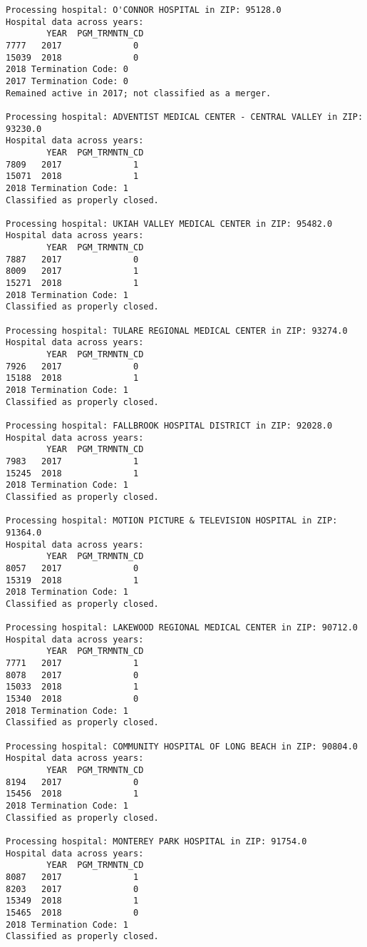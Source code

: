 \documentclass[
  letterpaper,
  DIV=11,
  numbers=noendperiod]{scrartcl}
\begin{document}
\begin{verbatim}
Processing hospital: O'CONNOR HOSPITAL in ZIP: 95128.0
Hospital data across years:
        YEAR  PGM_TRMNTN_CD
7777   2017              0
15039  2018              0
2018 Termination Code: 0
2017 Termination Code: 0
Remained active in 2017; not classified as a merger.

Processing hospital: ADVENTIST MEDICAL CENTER - CENTRAL VALLEY in ZIP: 93230.0
Hospital data across years:
        YEAR  PGM_TRMNTN_CD
7809   2017              1
15071  2018              1
2018 Termination Code: 1
Classified as properly closed.

Processing hospital: UKIAH VALLEY MEDICAL CENTER in ZIP: 95482.0
Hospital data across years:
        YEAR  PGM_TRMNTN_CD
7887   2017              0
8009   2017              1
15271  2018              1
2018 Termination Code: 1
Classified as properly closed.

Processing hospital: TULARE REGIONAL MEDICAL CENTER in ZIP: 93274.0
Hospital data across years:
        YEAR  PGM_TRMNTN_CD
7926   2017              0
15188  2018              1
2018 Termination Code: 1
Classified as properly closed.

Processing hospital: FALLBROOK HOSPITAL DISTRICT in ZIP: 92028.0
Hospital data across years:
        YEAR  PGM_TRMNTN_CD
7983   2017              1
15245  2018              1
2018 Termination Code: 1
Classified as properly closed.

Processing hospital: MOTION PICTURE & TELEVISION HOSPITAL in ZIP: 91364.0
Hospital data across years:
        YEAR  PGM_TRMNTN_CD
8057   2017              0
15319  2018              1
2018 Termination Code: 1
Classified as properly closed.

Processing hospital: LAKEWOOD REGIONAL MEDICAL CENTER in ZIP: 90712.0
Hospital data across years:
        YEAR  PGM_TRMNTN_CD
7771   2017              1
8078   2017              0
15033  2018              1
15340  2018              0
2018 Termination Code: 1
Classified as properly closed.

Processing hospital: COMMUNITY HOSPITAL OF LONG BEACH in ZIP: 90804.0
Hospital data across years:
        YEAR  PGM_TRMNTN_CD
8194   2017              0
15456  2018              1
2018 Termination Code: 1
Classified as properly closed.

Processing hospital: MONTEREY PARK HOSPITAL in ZIP: 91754.0
Hospital data across years:
        YEAR  PGM_TRMNTN_CD
8087   2017              1
8203   2017              0
15349  2018              1
15465  2018              0
2018 Termination Code: 1
Classified as properly closed.


\end{verbatim}
\end{document}

